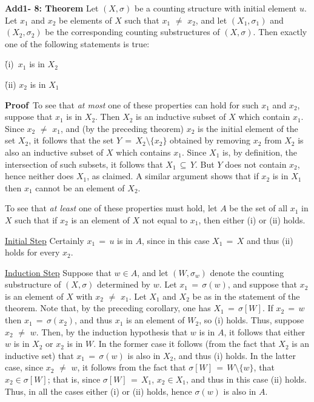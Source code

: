 \V
\V

        {\bf Add1- 8: Theorem} Let $(X,{\sigma})$ be a counting structure with initial element $u$.
    Let $x_{1}$ and $x_{2}$ be elements of $X$ such that $x_{1} \,\,{\neq}\,\, x_{2}$, and let $(X_{1},{\sigma}_{1})$ and $(X_{2},{\sigma}_{2})$ be the corresponding counting substructures of $(X,{\sigma})$.
    Then exactly one of the following statements is true:

        \h (i)\, $x_{1}$ is in $X_{2}$

        \h (ii)  $x_{2}$ is in $X_{1}$

\V

        {\bf Proof}\,  To see that {\em at most} one of these properties can hold for such $x_{1}$ and $x_{2}$,
    suppose that $x_{1}$ is in $X_{2}$. Then $X_{2}$ is an inductive subset of $X$ which contain $x_{1}$.
    Since $x_{2} \,\,{\neq}\,\, x_{1}$, and (by the preceding theorem) $x_{2}$ is the initial element of the set $X_{2}$,
    it follows that the set $Y \,=\, X_{2}{\setminus}\{x_{2}\}$ obtained by removing $x_{2}$ from $X_{2}$ is also an inductive subset of $X$ which contains $x_{1}$.
    Since $X_{1}$ is, by definition, the intersection of such subsets, it follows that $X_{1} \,{\subseteq}\, Y$.
    But $Y$ does not contain $x_{2}$, hence neither does $X_{1}$, as claimed.
    A similar argument shows that if $x_{2}$ is in $X_{1}$ then $x_{1}$ cannot be an element of $X_{2}$.

        To see that {\em at least} one of these properties must hold, let $A$ be the set of all $x_{1}$ in $X$ such that if $x_{2}$ is an element of $X$ not equal to $x_{1}$, then either (i) or (ii) holds.

        \underline{Initial Step} Certainly $x_{1} \,=\, u$ is in $A$, since in this case $X_{1} \,=\, X$ and thus (ii) holds for every $x_{2}$.

        \underline{Induction Step} Suppose that $w{\in}A$, and let $(W,{\sigma}_{w})$ denote the counting substructure of $(X,{\sigma})$ determined by $w$.
    Let $x_{1} \,=\, {\sigma}(w)$, and suppose that $x_{2}$ is an element of $X$ with $x_{2} \,\,{\neq}\,\, x_{1}$.
    Let $X_{1}$ and $X_{2}$ be as in the statement of the theorem. Note that, by the preceding corollary, one has $X_{1} \,=\, {\sigma}[W]$.
    If $x_{2} \,=\, w$ then $x_{1} \,=\, {\sigma}(x_{2})$, and thus $x_{1}$ is an element of $W_{2}$, so (i) holds.
    Thus, suppose $x_{2} \,\,{\neq}\,\, w$.
    Then, by the induction hypothesis that $w$ is in $A$, it follows that either $w$ is in $X_{2}$ or $x_{2}$ is in $W$.
    In the former case it follows (from the fact that $X_{2}$ is an inductive set) that $x_{1} \,=\, {\sigma}(w)$ is also in $X_{2}$, and thus (i) holds.
    In the latter case, since $x_{2} \,\,{\neq}\,\, w$, it follows from the fact that ${\sigma}[W] \,=\, W{\setminus}\{w\}$, that $x_{2}{\in}{\sigma}[W]$; that is, since ${\sigma}[W] \,=\, X_{1}$, $x_{2}{\in}X_{1}$, and thus in this case (ii) holds.
    Thus, in all the cases either (i) or (ii) holds, hence ${\sigma}(w)$ is also in $A$.

